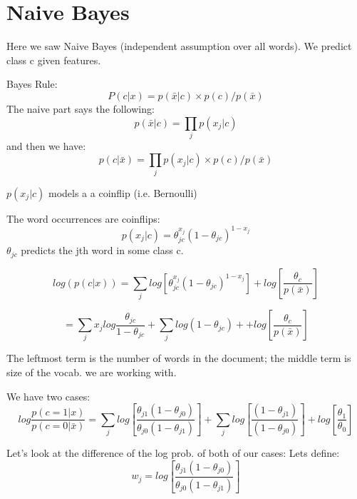 
\section{Naive Bayes}
Here we saw Naive Bayes (independent assumption over all words). We predict class c given features. 

Bayes Rule:
\begin{equation}
P( c|x) = p(\bar{x}|c)\times{p(c)/p(\bar{x})}
\end{equation}
The naive part says the following:  
\begin{equation}
p(\bar{x}|c)=\prod_{j}{ p(x_{j}|c)}
\end{equation}
and then we have:
\begin{equation}
 p(c|\bar{x})=\prod_{j}{ p(x_{j}|c)}\times{p(c)/p(\bar{x})}
\end{equation}

$p(x_{j}|c)$ models a a coinflip (i.e. Bernoulli)

The word occurrences are coinflips:
\begin{equation}
p(x_{j}|c)=\theta_{jc}^{x_{j}}(1-\theta_{jc})^{1-x_{j}}
\end{equation}
$\theta_{jc}$ predicts the jth word in some class c.

 \begin{equation}
 log(p(c|x)) = \sum\limits_{j}log[\theta_{jc}^{x_{j}}(1-\theta_{jc})^{1-x_{j}}] + log [\frac{\theta_{c}}{p(\bar{x})}]
 \end{equation}
 
 \begin{equation}
= \sum\limits_{j}x_{j}log\frac{\theta_{jc}}{1-\theta_{jc}} +
 \sum\limits_{j} log(1-\theta_{jc}) + + log [\frac{\theta_{c}}{p(\bar{x})}]
 \end{equation}
 
The leftmost term is the number of words in the document; the middle term is size of the vocab. we are working with. 

We have two cases:
\begin{equation}
log\frac{p(c=1|x)}{p(c=0|\bar{x})} = \sum\limits_{j}log[\frac{\theta_{j1}(1-\theta_{j0})}{\theta_{j0}(1-\theta_{j1})}] + \sum\limits_{j}log[\frac{(1-\theta_{j1})}{(1-\theta_{j0})}] + log[\frac{\theta_{1}}{\theta_{0}}]
\end{equation}

Let's look at the difference of the log prob. of both of our cases:
Lets define:
\begin{equation}
w_{j} = log[\frac{\theta_{j1}(1-\theta_{j0})}{\theta_{j0}(1-\theta_{j1})}]
\end{equation}

